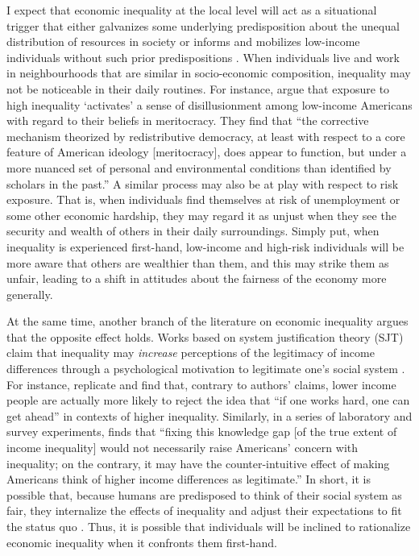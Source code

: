 \documentclass[12pt, letter]{scrartcl}
\begin{document}
I expect that economic inequality at the local level will act as a situational trigger that either galvanizes some underlying predisposition about the unequal distribution of resources in society or informs and mobilizes low-income individuals without such prior predispositions \parencite{sniderman2004predisposing}. When individuals live and work in neighbourhoods that are similar in socio-economic composition, inequality  may not be noticeable in their daily routines.  For instance, \textcite{newman2015false} argue that exposure to high inequality `activates'  a sense of disillusionment among low-income Americans with regard to their beliefs in meritocracy. They find that ``the corrective mechanism theorized by redistributive democracy, at least with respect to a core feature of American ideology [meritocracy], does appear to function, but under a more nuanced set of personal and environmental conditions than identified by scholars in the past.'' A similar process may also be at play with respect to risk exposure. That is, when individuals find themselves at risk of unemployment or some other economic hardship, they may regard it as unjust when they see the security and wealth of others in their daily surroundings. Simply put, when inequality is experienced first-hand, low-income and high-risk individuals will be more aware that others are wealthier than them, and this may strike them as unfair, leading to a shift in attitudes about the fairness of the economy more generally.

At the same time, another branch of the literature on economic inequality argues that the opposite effect holds. Works based on system justification theory (SJT) claim that inequality may \textit{increase} perceptions of the legitimacy of income differences through a psychological motivation to legitimate one's social system \parencite{trump2017income}. For instance, \textcite{solt2016economic, solt2017economic} replicate \textcite{newman2015false} and find that, contrary to authors' claims, lower income people are actually more likely to reject the idea that ``if one works hard, one can get ahead'' in contexts of higher inequality. Similarly, in a series of laboratory and survey experiments, \textcite[20]{trump2017income} finds that ``fixing this knowledge gap [of the true extent of income inequality] would not necessarily raise Americans’ concern with inequality; on the contrary, it may have the counter-intuitive effect of making Americans think of higher income differences as legitimate.'' In short, it is possible that, because humans are predisposed to think of their social system as fair, they internalize the effects of inequality and adjust their expectations to fit the status quo \parencite{jost2004decade}. Thus, it is possible that individuals will be inclined to rationalize economic inequality when it confronts them first-hand. 
\end{document}

